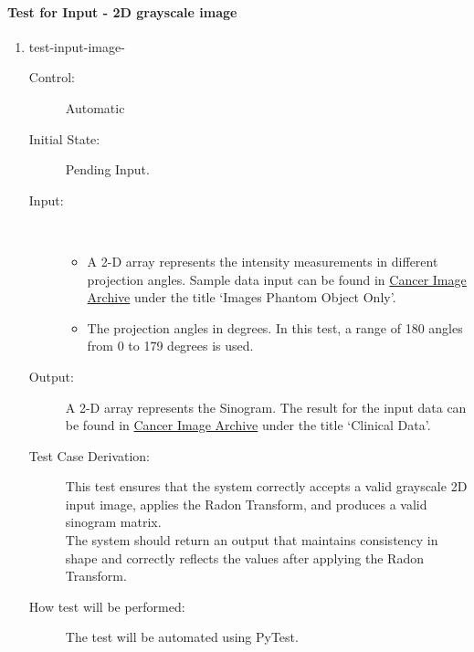 \documentclass[12pt, titlepage]{article}
\newcounter{testnum}
\begin{document}
\begin{cross}
\paragraph{Test for Input - 2D grayscale image}
\begin{enumerate}
\item{test-input-image-}
\begin{description}
\item[Control:] Automatic

\item[Initial State:] Pending Input.

\item[Input:] \hfill \\
  \begin{itemize}
  \item A 2-D array represents the intensity measurements in different projection
    angles. Sample data input can be found in
    \href{https://www.cancerimagingarchive.net/collection/ldct-and-projection-data/}{Cancer
      Image Archive} under the title \lq Images Phantom Object Only\rq.
  \item  The projection angles in degrees. In this test, a range of 180 angles from 0 to
    179 degrees is used.
  \end{itemize}

\item[Output:] A 2-D array represents the Sinogram. The result for the input data
  can be found in
  \href{https://www.cancerimagingarchive.net/collection/ldct-and-projection-data/}{Cancer
    Image Archive} under the title \lq Clinical Data\rq.

\item[Test Case Derivation:] This test ensures that the system correctly accepts a
  valid grayscale 2D input image, applies the Radon Transform, and produces a
  valid sinogram matrix. \\
  The system should return an output that maintains consistency in shape and
  correctly reflects the values after applying the Radon Transform.

\item[How test will be performed:] The test will be automated using PyTest.
\end{description}
\end{enumerate}
\end{cross}
\end{document}

